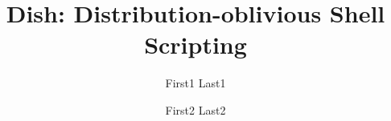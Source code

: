 \documentclass[letterpaper,twocolumn,10pt]{article}
\begin{document}
\title{Dish: Distribution-oblivious Shell Scripting}         %





\author{First1 Last1}

\author{First2 Last2}
\end{document}
